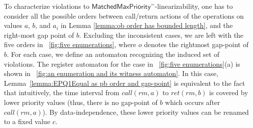 \documentclass[a4paper,UKenglish]{lipics-v2016}
\begin{document}
To characterize violations to $\mathsf{MatchedMaxPriority}^{=}$-linearizability, one has to consider all the possible orders between call/return actions of the operations on values $a$, $b$, and $a_i$ in Lemma \ref{lemma:ob order has bounded length}, and the right-most gap point of $b$. Excluding the inconsistent cases, we are left with the five orders in \figurename~\ref{fig:five enumerations}, where $o$ denotes the rightmost gap-point of $b$.
For each case, we define an automaton recognizing the induced set of violations. The register automaton for the case in \figurename~\ref{fig:five enumerations}(a) is shown in \figurename~\ref{fig:an enumeration and its witness automaton}. In this case, Lemma~\ref{lemma:EPQ1Equal as pb order and gap-point} is equivalent to the fact that intuitively, the time interval from $\textit{call}(\textit{rm},a)$ to $\textit{ret}(\textit{rm},b)$ is covered by lower priority values (thus, there is no gap-point of $b$ which occurs after $\textit{call}(\textit{rm},a)$). By data-independence, these lower priority values can be renamed to a fixed value $c$. 
\end{document}
